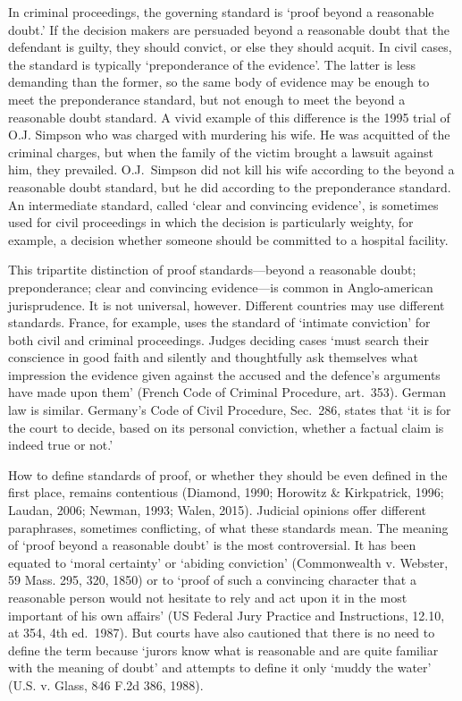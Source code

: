 \documentclass[10pt,dvipsnames]{scrartcl}
\begin{document}
In criminal proceedings, the governing standard is `proof beyond a
reasonable doubt.' If the decision makers are persuaded beyond a
reasonable doubt that the defendant is guilty, they should convict, or
else they should acquit. In civil cases, the standard is typically
`preponderance of the evidence'. The latter is less demanding than the
former, so the same body of evidence may be enough to meet the
preponderance standard, but not enough to meet the beyond a reasonable
doubt standard. A vivid example of this difference is the 1995 trial of
O.J. Simpson who was charged with murdering his wife. He was acquitted
of the criminal charges, but when the family of the victim brought a
lawsuit against him, they prevailed. O.J.~Simpson did not kill his wife
according to the beyond a reasonable doubt standard, but he did
according to the preponderance standard. An intermediate standard,
called `clear and convincing evidence', is sometimes used for civil
proceedings in which the decision is particularly weighty, for example,
a decision whether someone should be committed to a hospital facility.

This tripartite distinction of proof standards---beyond a reasonable
doubt; preponderance; clear and convincing evidence---is common in
Anglo-american jurisprudence. It is not universal, however. Different
countries may use different standards. France, for example, uses the
standard of `intimate conviction' for both civil and criminal
proceedings. Judges deciding cases `must search their conscience in good
faith and silently and thoughtfully ask themselves what impression the
evidence given against the accused and the defence's arguments have made
upon them' (French Code of Criminal Procedure, art.~353). German law is
similar. Germany's Code of Civil Procedure, Sec.~286, states that `it is
for the court to decide, based on its personal conviction, whether a
factual claim is indeed true or not.'

How to define standards of proof, or whether they should be even defined
in the first place, remains contentious (Diamond, 1990; Horowitz \&
Kirkpatrick, 1996; Laudan, 2006; Newman, 1993; Walen, 2015). Judicial
opinions offer different paraphrases, sometimes conflicting, of what
these standards mean. The meaning of `proof beyond a reasonable doubt'
is the most controversial. It has been equated to `moral certainty' or
`abiding conviction' (Commonwealth v. Webster, 59 Mass. 295, 320, 1850)
or to `proof of such a convincing character that a reasonable person
would not hesitate to rely and act upon it in the most important of his
own affairs' (US Federal Jury Practice and Instructions, 12.10, at 354,
4th ed.~1987). But courts have also cautioned that there is no need to
define the term because `jurors know what is reasonable and are quite
familiar with the meaning of doubt' and attempts to define it only
`muddy the water' (U.S. v. Glass, 846 F.2d 386, 1988).
\end{document}
